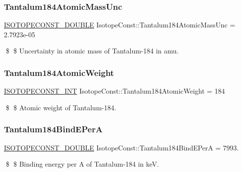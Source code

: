 \subsubsection{\texorpdfstring{Tantalum184\+Atomic\+Mass\+Unc}{Tantalum184AtomicMassUnc}}
{\footnotesize\ttfamily \mbox{\hyperlink{group___isotope_const-_macros_ga8f45a7272ce02c0b4c65c44636ed719a}{I\+S\+O\+T\+O\+P\+E\+C\+O\+N\+S\+T\+\_\+\+D\+O\+U\+B\+LE}} Isotope\+Const\+::\+Tantalum184\+Atomic\+Mass\+Unc = 2.\+7923e-\/05}

\$ \$ Uncertainty in atomic mass of Tantalum-\/184 in amu. \mbox{\label{group___isotope_const-_tantalum-_ta184_ga551f3f0282ddab7b687a02ed01a6d03a}} 
\subsubsection{\texorpdfstring{Tantalum184\+Atomic\+Weight}{Tantalum184AtomicWeight}}
{\footnotesize\ttfamily \mbox{\hyperlink{group___isotope_const-_macros_ga5f18360b3e99483a35c32d789e62621c}{I\+S\+O\+T\+O\+P\+E\+C\+O\+N\+S\+T\+\_\+\+I\+NT}} Isotope\+Const\+::\+Tantalum184\+Atomic\+Weight = 184}

\$ \$ Atomic weight of Tantalum-\/184. \mbox{\label{group___isotope_const-_tantalum-_ta184_gab2fc9608d4feee5e585f679f9946741d}} 
\subsubsection{\texorpdfstring{Tantalum184\+Bind\+E\+PerA}{Tantalum184BindEPerA}}
{\footnotesize\ttfamily \mbox{\hyperlink{group___isotope_const-_macros_ga8f45a7272ce02c0b4c65c44636ed719a}{I\+S\+O\+T\+O\+P\+E\+C\+O\+N\+S\+T\+\_\+\+D\+O\+U\+B\+LE}} Isotope\+Const\+::\+Tantalum184\+Bind\+E\+PerA = 7993.}

\$ \$ Binding energy per A of Tantalum-\/184 in keV. \mbox{\label{group___isotope_const-_tantalum-_ta184_ga35dba757ffbf52bc9baac32b4b2b6ee2}} 
